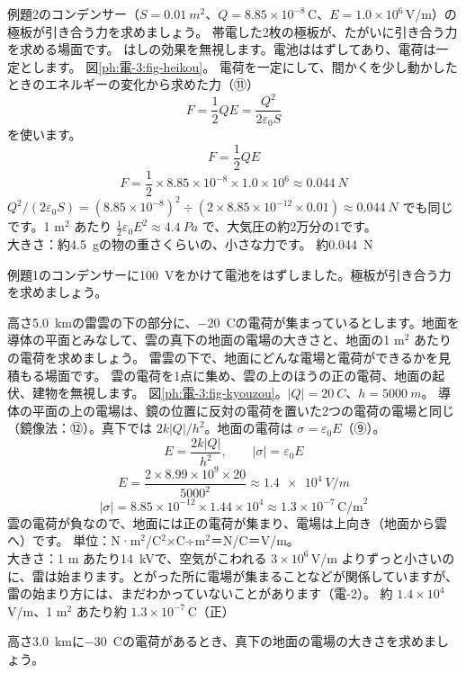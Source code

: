 \label{ph:電-3:ex11}
\begin{phreidai}[極板が引き合う力]
例題2のコンデンサー（$S=\qty{0.01}{m^2}$、$Q=8.85\times10^{-8}$\,C、$E=1.0\times10^6$\,V/m）の極板が引き合う力を求めましょう。
\phbamen
帯電した2枚の極板が、たがいに引き合う力を求める場面です。
\phmushi
はしの効果を無視します。電池ははずしてあり、電荷は一定とします。
\phzu
図\ref{ph:電-3:fig-heikou}。
\phriyu
電荷を一定にして、間かくを少し動かしたときのエネルギーの変化から求めた力（⑪）
\[F=\frac12QE=\frac{Q^2}{2\varepsilon_0S}\]
を使います。
\phtateru
\[F=\frac12QE\]
\phtoku
\[F=\frac12\times8.85\times10^{-8}\times1.0\times10^6\approx\qty{0.044}{N}\]
\phtashikame
$Q^2/(2\varepsilon_0S)=(8.85\times10^{-8})^2\div(2\times8.85\times10^{-12}\times0.01)\approx\qty{0.044}{N}$ でも同じです。1 m$^2$ あたり $\tfrac12\varepsilon_0E^2\approx\qty{4.4}{Pa}$ で、大気圧の約2万分の1です。\\
大きさ：約\qty{4.5}{g}の物の重さくらいの、小さな力です。
\kotae 約\qty{0.044}{N}
\end{phreidai}
\begin{jibun}
例題1のコンデンサーに\qty{100}{V}をかけて電池をはずしました。極板が引き合う力を求めましょう。
\end{jibun}

\label{ph:電-3:ex12}
\begin{phreidai}[雷雲の真下の地面の電場]
高さ\qty{5.0}{km}の雷雲の下の部分に、\qty{-20}{C}の電荷が集まっているとします。地面を導体の平面とみなして、雲の真下の地面の電場の大きさと、地面の1 m$^2$ あたりの電荷を求めましょう。
\phbamen
雷雲の下で、地面にどんな電場と電荷ができるかを見積もる場面です。
\phmushi
雲の電荷を1点に集め、雲の上のほうの正の電荷、地面の起伏、建物を無視します。
\phzu
図\ref{ph:電-3:fig-kyouzou}。$|Q|=\qty{20}{C}$、$h=\qty{5000}{m}$。
\phriyu
導体の平面の上の電場は、鏡の位置に反対の電荷を置いた2つの電荷の電場と同じ（鏡像法：⑫）。真下では $2k|Q|/h^2$。地面の電荷は $\sigma=\varepsilon_0E$（⑨）。
\phtateru
\[E=\frac{2k|Q|}{h^2},\qquad|\sigma|=\varepsilon_0E\]
\phtoku
\[E=\frac{2\times8.99\times10^9\times20}{5000^2}\approx\qty{1.4e4}{V/m}\]
\[|\sigma|=8.85\times10^{-12}\times1.44\times10^4\approx1.3\times10^{-7}\,\text{C/m}^2\]
雲の電荷が負なので、地面には正の電荷が集まり、電場は上向き（地面から雲へ）です。
\phtashikame
単位：N·m$^2$/C$^2$×C÷m$^2$＝N/C＝V/m。\\
大きさ：1 m あたり\qty{14}{kV}で、空気がこわれる $3\times10^6$\,V/m よりずっと小さいのに、雷は始まります。とがった所に電場が集まることなどが関係していますが、雷の始まり方には、まだわかっていないことがあります（電-2）。
\kotae 約 $1.4\times10^4$\,V/m、1 m$^2$ あたり約 $1.3\times10^{-7}$\,C（正）
\end{phreidai}
\begin{jibun}
高さ\qty{3.0}{km}に\qty{-30}{C}の電荷があるとき、真下の地面の電場の大きさを求めましょう。
\end{jibun}

